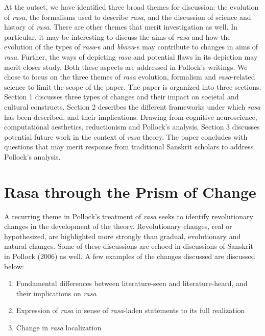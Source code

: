 At the outset, we have identified three broad themes for discussion: the evolution of \textsl{rasa}, the formalisms used to describe \textsl{rasa}, and the discussion of science and history of \textsl{rasa}. There are other themes that merit investigation as well. In particular, it may be interesting to discuss the aims of \textsl{rasa} and how the evolution of the types of \hbox{\textsl{rasa}-s} and \textsl{bhāva}-s may contribute to changes in aims of \textsl{rasa}. Further, the ways of depicting \textsl{rasa} and potential flaws in its depiction may merit closer study. Both these aspects are addressed in Pollock’s writings. We chose to focus on the three themes of \textsl{rasa} evolution, formalism and \textsl{rasa}-related science to limit the scope of the paper. The paper is organized into three sections. Section 1 discusses three types of changes and their impact on societal and cultural constructs. Section 2 describes the different frameworks under which \textsl{rasa} has been described, and their implications. Drawing from cognitive neuroscience, computational aesthetics, reductionism and Pollock’s analysis, Section 3 discusses potential future work in the context of \textsl{rasa} theory. The paper concludes with questions that may merit response from traditional Sanskrit scholars to address Pollock’s analysis.

\section*{Rasa through the Prism of Change}

A recurring theme in Pollock’s treatment of \textsl{rasa} seeks to identify revolutionary changes in the development of the theory. Revolutionary changes, real or hypothesized, are highlighted more strongly than gradual, evolutionary and natural changes. Some of these discussions are echoed in discussions of Sanskrit in Pollock (2006) as well. A few examples of the changes discussed are discussed below:
\begin{enumerate}
\itemsep=0pt
\item Fundamental differences between literature-seen and literature-heard, and their implications on \textsl{rasa }
\item Expression of \textsl{rasa} in sense of \textsl{rasa}-laden statements to its full realization
\item Change in \textsl{rasa} localization
\end{enumerate}

